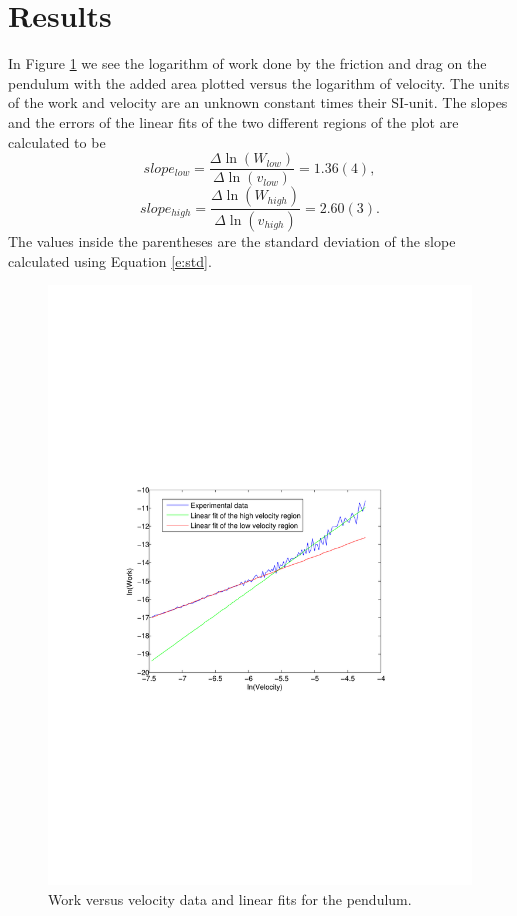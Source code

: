 \documentclass[11pt, a4paper]{article}
\begin{document}
\section{Results}
In Figure \ref{f:nopaper} we see the logarithm of work done by the friction and 
drag on the pendulum with the added area plotted versus the logarithm of velocity. 
The units of the work and velocity are an unknown constant times their SI-unit. 
The slopes and the errors of the linear fits of the two different regions of the plot are calculated to be
\[
	slope_{low}=\frac{\Delta\ln(W_{low})}{\Delta\ln(v_{low})} = 1.36(4),
\]\[
	slope_{high}=\frac{\Delta\ln(W_{high})}{\Delta\ln(v_{high})} = 2.60(3).
\]
The values inside the parentheses are the standard deviation of the slope calculated using Equation \ref{e:std}.

\begin{figure}[h]
	\centering
	\includegraphics[trim=10.0cm 10.0cm 10.0cm 10.0cm, scale=0.7]{no_paper}
	\caption{Work versus velocity data and  linear fits for the pendulum.}
	\label{f:nopaper}
\end{figure}
\end{document}
